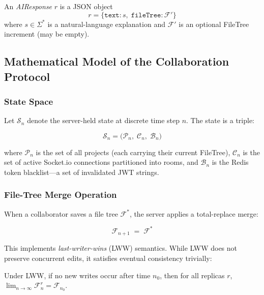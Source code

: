 \begin{definition}[AIResponse]
  \label{def:airesponse}
  An \emph{AIResponse} $r$ is a JSON object
  \[
    r = \bigl\{\texttt{text}: s,\; \texttt{fileTree}: \mathcal{F}'\bigr\}
  \]
  where $s \in \Sigma^*$ is a natural-language explanation and
  $\mathcal{F}'$ is an optional FileTree increment (may be empty).
\end{definition}

\subsection{Mathematical Model of the Collaboration Protocol}
\label{sub:math}

\subsubsection{State Space}

Let $\mathcal{S}_n$ denote the server-held state at discrete time step $n$.
The state is a triple:

\begin{equation}
  \mathcal{S}_n = \bigl( \mathcal{P}_n,\; \mathcal{C}_n,\; \mathcal{B}_n \bigr)
  \label{eq:state}
\end{equation}

\noindent where $\mathcal{P}_n$ is the set of all projects (each carrying
their current FileTree), $\mathcal{C}_n$ is the set of active Socket.io
connections partitioned into rooms, and $\mathcal{B}_n$ is the Redis token
blacklist---a set of invalidated JWT strings.

\subsubsection{File-Tree Merge Operation}

When a collaborator saves a file tree $\mathcal{F}^*$, the server applies
a total-replace merge:

\begin{equation}
  \mathcal{F}_{n+1} \;=\; \mathcal{F}^*
  \label{eq:merge_lww}
\end{equation}

This implements \emph{last-writer-wins} (LWW) semantics. While LWW does not
preserve concurrent edits, it satisfies eventual consistency trivially:

\begin{proposition}
  \label{prop:lvc}
  Under LWW, if no new writes occur after time $n_0$, then for all replicas
  $r$, $\lim_{n \to \infty} \mathcal{F}_n^r = \mathcal{F}_{n_0}$.
\end{proposition}

